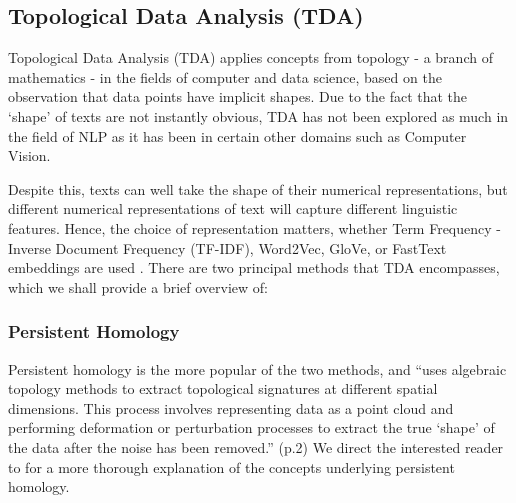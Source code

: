 \documentclass[12pt,twoside]{report}
\begin{document}
\subsection{Topological Data Analysis (TDA)}

Topological Data Analysis (TDA) applies concepts from topology - a branch of mathematics - in the fields of computer and data science, based on the observation that data points have implicit shapes. \cite{savle-etal-2019-topological} Due to the fact that the `shape' of texts are not instantly obvious, TDA has not been explored as much in the field of NLP as it has been in certain other domains such as Computer Vision. \cite{uchendu2024unveilingtopologicalstructurestext} \newline \par

Despite this, texts can well take the shape of their numerical representations, but different numerical representations of text will capture different linguistic features. Hence, the choice of representation matters, whether Term Frequency - Inverse Document Frequency (TF-IDF), Word2Vec, GloVe, or FastText embeddings are used \cite{uchendu2024unveilingtopologicalstructurestext}. There are two principal methods that TDA encompasses, which we shall provide a brief overview of:
\subsubsection{Persistent Homology}
Persistent homology is the more popular of the two methods, and ``uses algebraic topology methods to extract topological signatures at different spatial dimensions. This process involves representing data as a point cloud and performing deformation or perturbation processes to extract the true `shape' of the data after the noise has been removed.'' \cite{uchendu2024unveilingtopologicalstructurestext} (p.2) We direct the interested reader to \cite{uchendu2024unveilingtopologicalstructurestext} for a more thorough explanation of the concepts underlying persistent homology. \newline \par 
\end{document}

